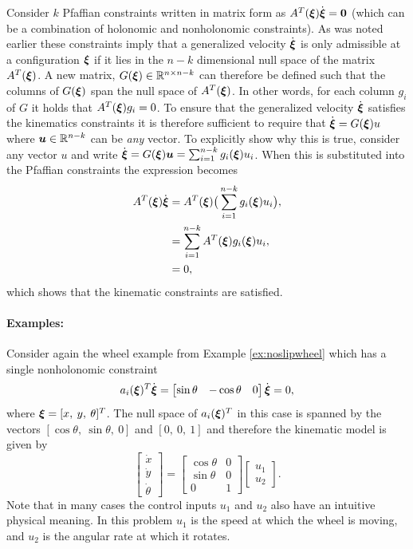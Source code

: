 Consider $k$ Pfaffian constraints written in matrix form as $A^T(\bm{\xi})\dot{\bm{\xi}}=\bm{0}$ (which can be a combination of holonomic and nonholonomic constraints). As was noted earlier these constraints imply that a generalized velocity $\dot{\bm{\xi}}$ is only admissible at a configuration $\bm{\xi}$ if it lies in the $n-k$ dimensional null space of the matrix $A^T(\bm{\xi})$. A new matrix, $G(\bm{\xi}) \in \mathbb{R}^{n \times n-k}$ can therefore be defined such that the columns of $G(\bm{\xi})$ span the null space of $A^T(\bm{\xi})$. In other words, for each column $g_i$ of $G$ it holds that $A^T(\bm{\xi})g_i = 0$. To ensure that the generalized velocity $\dot{\bm{\xi}}$ satisfies the kinematics constraints it is therefore sufficient to require that $\dot{\bm{\xi}} = G(\bm{\xi}) u$ where $\bm{u} \in \mathbb{R}^{n-k}$ can be \textit{any} vector. To explicitly show why this is true, consider any vector $u$ and write $\dot{\bm{\xi}} = G(\bm{\xi})\bm{u} = \sum_{i=1}^{n-k} g_i(\bm{\xi}) u_i$. When this is substituted into the Pfaffian constraints the expression becomes
\begin{equation*}
\begin{split}
A^T(\bm{\xi})\dot{\bm{\xi}} &= A^T(\bm{\xi})\big(\sum_{i=1}^{n-k} g_i(\bm{\xi}) u_i\big), \\
&= \sum_{i=1}^{n-k} A^T(\bm{\xi}) g_i(\bm{\xi}) u_i, \\
&= 0, \\
\end{split}
\end{equation*}
which shows that the kinematic constraints are satisfied.

\paragraph{Examples:} Consider again the wheel example from Example \ref{ex:noslipwheel} which has a single nonholonomic constraint
\begin{equation*}
a_i(\bm{\xi})^T\dot{\bm{\xi}} = \begin{bmatrix}
\sin \theta & -\cos \theta & 0
\end{bmatrix}\dot{\bm{\xi}}=0,
\end{equation*}
where $\bm{\xi} = [x,\:y, \:\theta]^T$. The null space of $a_i(\bm{\xi})^T$ in this case is spanned by the vectors $[\cos \theta, \: \sin \theta,\: 0]$ and $[0, \: 0,\: 1]$ and therefore the kinematic model is given by
\begin{equation} \label{eq:wheelkinmodel}
\begin{bmatrix}
\dot{x} \\ \dot{y} \\ \dot{\theta}
\end{bmatrix} = \begin{bmatrix}
\cos \theta & 0 \\
\sin\theta & 0 \\
0 & 1
\end{bmatrix}\begin{bmatrix}
u_1 \\ u_2
\end{bmatrix}.
\end{equation}
Note that in many cases the control inputs $u_1$ and $u_2$ also have an intuitive physical meaning. In this problem $u_1$ is the speed at which the wheel is moving, and $u_2$ is the angular rate at which it rotates. 

